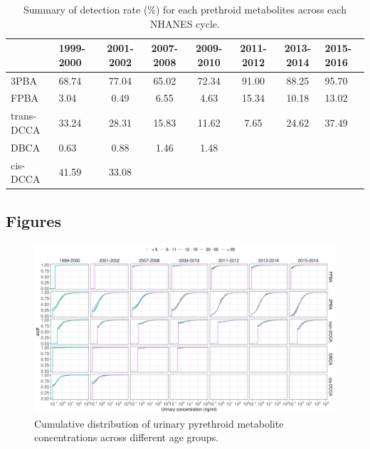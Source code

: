 \begin{table}[h]
\begin{adjustwidth}{-4cm}{}
\caption{Summary of detection rate (\%) for each prethroid metabolites across each NHANES cycle.}
\label{tab:tabs6}
\begin{tabular}{llcccccl}
\toprule
 & 1999-2000 & 2001-2002 & 2007-2008 & 2009-2010 & 2011-2012 & 2013-2014 & 2015-2016\\
\midrule
3PBA & 68.74 & 77.04 & 65.02 & 72.34 & 91.00 & 88.25 & 95.70\\
FPBA & 3.04 & 0.49 & 6.55 & 4.63 & 15.34 & 10.18 & 13.02\\
trans-DCCA & 33.24 & 28.31 & 15.83 & 11.62 & 7.65 & 24.62 & 37.49\\
DBCA & 0.63 & 0.88 & 1.46 & 1.48 &  &  & \\
cis-DCCA & 41.59 & 33.08 &  &  &  &  & \\
\bottomrule
\end{tabular}
\end{adjustwidth}
\end{table}

\subsection{Figures}

\begin{figure}[h]
\begin{adjustwidth}{-4cm}{}
\includegraphics[width=\linewidth]{figures/fig3} 
\hfill
\end{adjustwidth}
\caption{Cumulative distribution of urinary pyrethroid metabolite concentrations across different age groups.}\label{fig:ecdf}
\end{figure}
